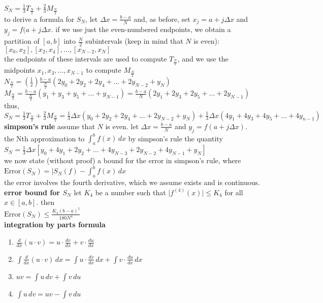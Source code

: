 \documentclass{article}
\begin{document}
$S_N = \frac{1}{3}T_{\frac{N}{2}} + \frac{2}{3}M_{\frac{N}{2}}$\\

to derive a formula for $S_N$, let $\Delta x = \frac{b - a}{N}$ and, as before, set $x_j = a + j\Delta x$ and $y_j = f(a + j\Delta x$. if we use just the even-numbered endpoints, we obtain a partition of $[a, b]$ into $\frac{N}{2}$ subintervals (keep in mind that $N$ is even):\\ $[x_0, x_2], [x_2, x_4], \ldots, [x_{N-2}, x_N]$\\ the endpoints of these intervals are used to compute $T_{\frac{N}{2}}$, and we use the midpoints $x_1, x_3, \ldots, x_{N-1}$ to compute $M_{\frac{N}{2}}$\\
$N_{\frac{N}{2}} = (\frac{1}{2})\frac{b - a}{\frac{N}{2}}(2y_0 + 2y_2 + 2y_4 + \ldots + 2y_{N-2} + y_N)$\\
$M_{\frac{N}{2}} = \frac{b - a}{\frac{N}{2}}(y_1 + y_3 + y_5 + \ldots + y_{N-1}) = \frac{b - a}{N}(2y_1 + 2y_3 + 2y_5 + \ldots + 2y_{N-1})$\\
thus,\\
$S_N = \frac{1}{3}T_{\frac{N}{2}} + \frac{2}{3}M_{\frac{N}{2}} = \frac{1}{3}\Delta x(y_0 + 2y_2 + 2y_4 + \ldots + 2y_{N-2} + y_N) + \frac{1}{3}\Delta x(4y_1 + 4y_3 + 4y_5 + \ldots + 4y_{n-1})$\\

\textbf{simpson's rule} assume that $N$ is even. let $\Delta x = \frac{b - a}{N}$ and $y_j = f(a + j\Delta x)$.\\
the Nth approximation to $\int_{a}^{b}f(x)\,dx$ by simpson's rule the quantity\\
$S_N = \frac{1}{3}\Delta x[y_0 + 4y_1 + 2y_2 + \ldots + 4y_{N-3} + 2y_{N-2} + 4y_{N-1} + y_N]$\\

we now state (without proof) a bound for the error in simpson's rule, where\\
$\text{Error}(S_N) = \lvert S_N(f) - \int_{a}^{b}f(x)\,dx$\\
the error involves the fourth derivative, which we assume exists and is continuous.\\

\textbf{error bound for $S_N$} let $K_4$ be a number such that $\lvert f^{(4)}(x)\rvert \leq K_4$ for all $x \in [a, b]$. then\\
$\text{Error}(S_N) \leq \frac{K_4(b - a)^5}{180N^4}$\\

\textbf{integration by parts formula}
	\begin{enumerate}
		\item $\frac{d}{dx}(u\cdot v) = u \cdot \frac{dv}{dx} + v \cdot \frac{du}{dx}$
		\item $\int\frac{d}{dx}(u\cdot v)\,dx = \int u \cdot \frac{dv}{dx}\,dx + \int v \cdot \frac{du}{dx}\,dx$
		\item $uv = \int u\,dv + \int v\,du$
		\item $\int u\,dv = uv - \int v\,du$
	\end{enumerate}
\end{document}
